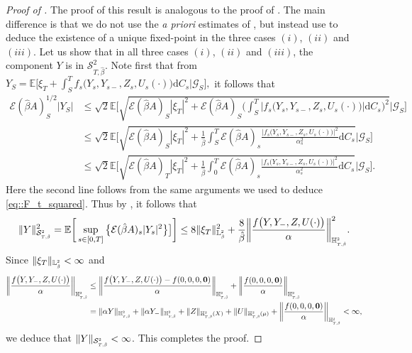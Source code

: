 \documentclass[10pt]{article} %
\newcommand\cE{\mathcal E}
\newcommand\cG{\mathcal G}
\newcommand\cS{\mathcal S}
\newcommand{\smalltext}[1]{\text{\fontsize{4}{4}\selectfont$#1$}}
\def \E{\mathbb{E}}
\def \H{\mathbb{H}}
\def \L{\mathbb{L}}
\newcommand{\1}{\mathbf{1}}
\def\d{\mathrm{d}}
\begin{document}
\begin{proof}[Proof of ]
	The proof of this result is analogous to the proof of . The main difference is that we do not use the \emph{a priori} estimates of , but instead use  to deduce the existence of a unique fixed-point in the three cases $(i)$, $(ii)$ and $(iii)$. Let us show that in all three cases $(i)$, $(ii)$ and $(iii)$, the component $Y$ is in $\cS^2_{T,\hat\beta}$. Note first that from $Y_S = \E\big[\xi_T + \int_S^T f_s\big(Y_s,Y_{s-},Z_s,U_s(\cdot)\big)\d C_s \big| \cG_S\big],$ it follows that
	\begin{align*}
		\cE(\hat\beta A)^{1/2}_S|Y_S| 
		&\leq \sqrt{2}\E\Bigg[\sqrt{\cE(\hat\beta A)_S|\xi_T|^2 + \cE(\hat\beta A)_S\bigg(\int_S^T  \big|f_s\big(Y_s,Y_{s-},Z_s,U_s(\cdot)\big)\big|\d C_s\bigg)^2} \Bigg| \cG_S\Bigg] \\
		&\leq \sqrt{2}\E\Bigg[\sqrt{\cE(\hat\beta A)_S|\xi_T|^2 + \frac{1}{\hat\beta}\int_S^T \cE(\hat\beta A)_s \frac{\big|f_s\big(Y_s,Y_{s-},Z_s,U_s(\cdot)\big)\big|^2}{\alpha^2_s}\d C_s} \Bigg| \cG_S\Bigg] \\
		&\leq \sqrt{2}\E\Bigg[\sqrt{\cE(\hat\beta A)_T|\xi_T|^2 + \frac{1}{\hat\beta}\int_0^T \cE(\hat\beta A)_s \frac{\big|f_s\big(Y_s,Y_{s-},Z_s,U_s(\cdot)\big)\big|^2}{\alpha^2_s}\d C_s} \Bigg| \cG_S\Bigg].
	\end{align*}
	Here the second line follows from the same arguments we used to deduce \eqref{eq::F_t_squared}.
	Thus by , it follows that
	\begin{equation*}
		\|Y\|^2_{\cS^\smalltext{2}_{\smalltext{T}\smalltext{,}\smalltext{\hat\beta}}} 
		= \E\bigg[\sup_{s \in [0,T]}\big\{\cE(\hat\beta A)_s|Y_s|^2\big\}\big]\bigg] 
		\leq 8 \|\xi_T\|^2_{\L^\smalltext{2}_\smalltext{\hat\beta}} + \frac{8}{\hat\beta} \bigg\|\frac{f\big(Y,Y_-,Z,U(\cdot)\big)}{\alpha}\bigg\|^2_{\H^\smalltext{2}_{\smalltext{T}\smalltext{,}\smalltext{\hat\beta}}}.
	\end{equation*}
	Since $\|\xi_T\|_{\L^\smalltext{2}_\smalltext{\hat\beta}} < \infty$ and 
	\begin{align*}
		\bigg\|\frac{f\big(Y,Y_-,Z,U(\cdot)\big)}{\alpha}\bigg\|_{\H^\smalltext{2}_{\smalltext{T}\smalltext{,}\smalltext{\hat\beta}}} 
		&\leq \bigg\|\frac{f\big(Y,Y_-,Z,U(\cdot)\big)-f(0,0,0,\mathbf{0})}{\alpha}\bigg\|_{\H^\smalltext{2}_{\smalltext{T}\smalltext{,}\smalltext{\hat\beta}}} + \bigg\|\frac{f(0,0,0,\mathbf{0})}{\alpha}\bigg\|_{\H^\smalltext{2}_{\smalltext{T}\smalltext{,}\smalltext{\hat\beta}}} \\
		&= \|\alpha Y\|_{\H^\smalltext{2}_{\smalltext{T}\smalltext{,}\smalltext{\hat\beta}}} + \|\alpha Y_-\|_{\H^\smalltext{2}_{\smalltext{T}\smalltext{,}\smalltext{\hat\beta}}} + \|Z\|_{\H^\smalltext{2}_{\smalltext{T}\smalltext{,}\smalltext{\hat\beta}}(X)} + \|U\|_{\H^\smalltext{2}_{\smalltext{T}\smalltext{,}\smalltext{\hat\beta}}(\mu)} + \bigg\|\frac{f(0,0,0,\mathbf{0})}{\alpha}\bigg\|_{\H^\smalltext{2}_{\smalltext{T}\smalltext{,}\smalltext{\hat\beta}}} < \infty,
	\end{align*}
	we deduce that $\|Y\|_{\cS^\smalltext{2}_{\smalltext{T}\smalltext{,}\smalltext{\hat\beta}}} < \infty$. This completes the proof.
	

\end{proof}
\end{document}
